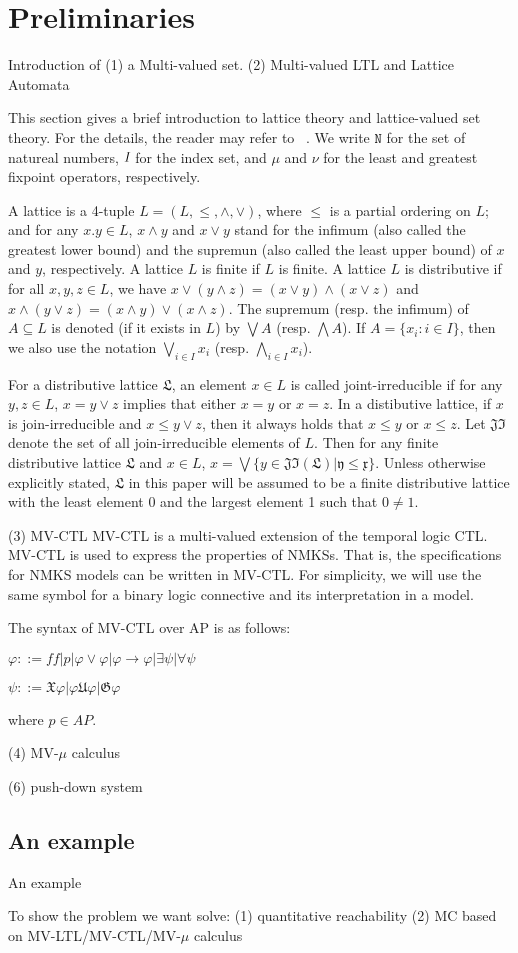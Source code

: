 \section{Preliminaries}

Introduction of
(1)  a Multi-valued set.
(2) Multi-valued LTL  and  Lattice Automata ~\cite{Kupferman97}

This section gives a brief introduction to lattice theory and lattice-valued set theory. For the details, the reader may refer to ~\cite{}. We write  $\texttt{N}$ for the set of natureal numbers, $\emph{I}$ for the index set, and $\mu$ and $\nu$ for the least and greatest fixpoint operators, respectively. 

A lattice is a 4-tuple $\textit{L}=(L, \leq, \wedge,\vee)$, where $\leq$ is a partial ordering on $L$; and for any $x. y\in L$, $x\wedge y$ and $x\vee y$ stand for the infimum (also called the greatest lower bound) and the supremun (also called the least upper bound) of $x$ and $y$, respectively. A lattice $\textit{L}$ is finite if $L$ is finite. A lattice $L$ is distributive if for all $x, y,z\in L $, we have $x \vee (y\wedge z)=(x\vee y)\wedge(x \vee z)$ and $x\wedge (y\vee z)=(x\wedge y)\vee (x\wedge z)$. The supremum (resp. the infimum) of $A\subseteq L$ is denoted (if it exists in $L$) by $\bigvee A$ (resp. $\bigwedge A$). If $A=\{x_i :i\in I\}$, then we also use the notation $\bigvee\limits_{i\in I} x_i$ (resp. $\bigwedge\limits_{i\in I} x_i$). 

For a distributive lattice $\mathfrak{L}$, an element $x\in L$ is called joint-irreducible if for any $y, z\in L$, $ x=y\vee z$ implies that either $x=y$ or $x=z$. In a distibutive lattice, if $x$ is join-irreducible and $x\leq y\vee z$, then it always holds that $x\leq y$ or $x\leq z$. Let $\mathfrak{JI}$ denote the set of all join-irreducible elements of $L$. Then for any finite distributive lattice $\mathfrak{L}$ and $x\in L$, $x= \bigvee\{y\in \mathfrak{JI(L)| y\leq x}\}$. Unless otherwise explicitly stated, $\mathfrak{L}$ in this paper will be assumed to be a finite distributive lattice with the least element 0 and the largest element 1 such that $0\neq 1$. 


(3)  MV-CTL
MV-CTL is a multi-valued extension of the temporal logic CTL. MV-CTL is used to express the properties of NMKSs. That is, the specifications for NMKS models can be written in MV-CTL. For simplicity, we will  use the same symbol for a binary logic connective and its interpretation in a model. 
\begin{definition}
The syntax of MV-CTL over AP is as follows: \\
\centerline{$\varphi ::=ff | p|\varphi\vee \varphi | \varphi\rightarrow \varphi| \exists \psi |\forall \psi$}
\centerline{$\psi::=\mathfrak{X}\varphi |\varphi\mathfrak{U}\varphi | \mathfrak{G}\varphi$}

where $p\in AP$. 

\end{definition} 

(4)  MV-$\mu$ calculus

(6) push-down system

\subsection { An example}

An example~\cite{ppt : MC-with MV Logics Bruns}

To show the problem we want solve:
(1) quantitative reachability
(2) MC based on MV-LTL/MV-CTL/MV-$\mu$ calculus
